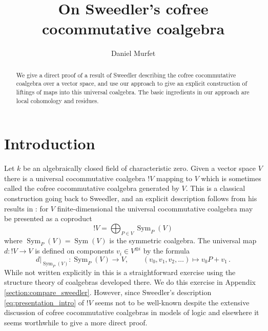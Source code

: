 \documentclass[english,letter paper,12pt,reqno]{article}
\theoremstyle{example}
\numberwithin{equation}{section}
\def\res{\operatorname{Res}}
\DeclareMathOperator{\Sym}{Sym}
\begin{document}
\def\ScoreOverhang{1pt}

\def\Res{\res\!}
\newcommand{\ud}[1]{\operatorname{d}\!{#1}}
\newcommand{\Ress}[1]{\res_{#1}\!}
\newcommand{\cat}[1]{\mathcal{#1}}
\newcommand{\lto}{\longrightarrow}
\newcommand{\xlto}[1]{\stackrel{#1}\lto}
\newcommand{\mf}[1]{\mathfrak{#1}}
\newcommand{\md}[1]{\mathscr{#1}}
\newcommand{\church}[1]{\underline{#1}}
\newcommand{\prf}[1]{\underline{#1}}
\newcommand{\den}[1]{\llbracket #1 \rrbracket}
\def\l{\,|\,}
\def\sgn{\textup{sgn}}
\def\cont{\operatorname{cont}}

\title{On Sweedler's cofree cocommutative coalgebra}
\author{Daniel Murfet}

\maketitle

\begin{abstract} We give a direct proof of a result of Sweedler describing the cofree cocommutative coalgebra over a vector space, and use our approach to give an explicit construction of liftings of maps into this universal coalgebra. The basic ingredients in our approach are local cohomology and residues.
\end{abstract}

\section{Introduction}

Let $k$ be an algebraically closed field of characteristic zero. Given a vector space $V$ there is a universal cocommutative coalgebra ${!}V$ mapping to $V$ which is sometimes called the cofree cocommutative coalgebra generated by $V$. This is a classical construction going back to Sweedler, and an explicit description follows from his results in \cite{sweedler}: for $V$ finite-dimensional the universal cocommutative coalgebra may be presented as a coproduct
\begin{equation}\label{eq:presentation_intro}
{!} V = \bigoplus_{P \in V} \Sym_P(V)
\end{equation}
where $\Sym_P(V) = \Sym(V)$ is the symmetric coalgebra. The universal map $d: {!} V \lto V$ is defined on components $v_i \in V^{\otimes i}$ by the formula
\[
d|_{\Sym_P(V)}: \Sym_P(V) \lto V, \qquad (v_0,v_1,v_2,\ldots) \longmapsto v_0 P + v_1\,.
\]
While not written explicitly in \cite{sweedler} this is a straightforward exercise using the structure theory of coalgebras developed there. We do this exercise in Appendix \ref{section:compare_sweedler}. However, since Sweedler's description \eqref{eq:presentation_intro} of ${!} V$ seems not to be well-known despite the extensive discussion of cofree cocommutative coalgebras in models of logic \cite{blute,hyland,mellies2} and elsewhere it seems worthwhile to give a more direct proof. 
\end{document}
